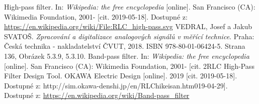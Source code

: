 \documentclass[twoside]{article}
\begin{document}
\begin{thebibliography}{999}
High-pass filter. In: \textit{Wikipedia: the free encyclopedia} [online]. San Francisco (CA): Wikimedia Foundation, 2001- [cit. 2019-05-18]. Dostupné z: \url{https://en.wikipedia.org/wiki/File:RLC_high-pass.svg}
VEDRAL, Josef a Jakub SVATOŠ. \textit{Zpracování a digitalizace analogových signálů v měřící technice}. Praha: Česká technika - nakladatelství ČVUT, 2018. ISBN 978-80-01-06424-5. Strana 136, Obrázek 5.3.9, 5.3.10.
Band-pass filter. In: \textit{Wikipedia: the free encyclopedia} [online]. San Francisco (CA): Wikimedia Foundation, 2001- [cit. 2RLC High-Pass Filter Design Tool. OKAWA Electric Design [online]. 2019 [cit. 2019-05-18]. Dostupné z: http://sim.okawa-denshi.jp/en/RLChikeisan.htm019-04-29]. Dostupné z: \url{https://en.wikipedia.org/wiki/Band-pass_filter}
\end{thebibliography}
\end{document}
